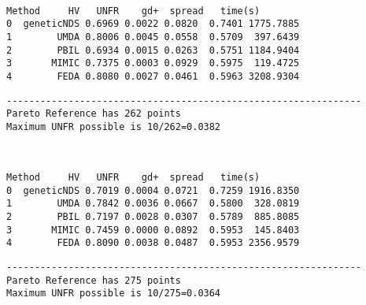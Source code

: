 \documentclass[11pt]{article}
\begin{document}
    \begin{center}
    \end{center}
    { \hspace*{\fill} \\}
    
    
    \begin{Verbatim}[commandchars=\\\{\}]
       Method     HV   UNFR    gd+  spread   time(s)
0  geneticNDS 0.6969 0.0022 0.0820  0.7401 1775.7885
1        UMDA 0.8006 0.0045 0.0558  0.5709  397.6439
2        PBIL 0.6934 0.0015 0.0263  0.5751 1184.9404
3       MIMIC 0.7375 0.0003 0.0929  0.5975  119.4725
4        FEDA 0.8080 0.0027 0.0461  0.5963 3208.9304
    \end{Verbatim}

    
    \begin{Verbatim}[commandchars=\\\{\}]
---------------------------------------------------------------
Pareto Reference has 262 points
Maximum UNFR possible is 10/262=0.0382
    \end{Verbatim}

    \begin{center}
    \end{center}
    { \hspace*{\fill} \\}
    
    
    \begin{Verbatim}[commandchars=\\\{\}]
       Method     HV   UNFR    gd+  spread   time(s)
0  geneticNDS 0.7019 0.0004 0.0721  0.7259 1916.8350
1        UMDA 0.7842 0.0036 0.0667  0.5800  328.0819
2        PBIL 0.7197 0.0028 0.0307  0.5789  885.8085
3       MIMIC 0.7459 0.0000 0.0892  0.5953  145.8403
4        FEDA 0.8090 0.0038 0.0487  0.5953 2356.9579
    \end{Verbatim}

    
    \begin{Verbatim}[commandchars=\\\{\}]
---------------------------------------------------------------
Pareto Reference has 275 points
Maximum UNFR possible is 10/275=0.0364
    \end{Verbatim}

    \begin{center}
    \end{center}
    { \hspace*{\fill} \\}
    
\end{document}
